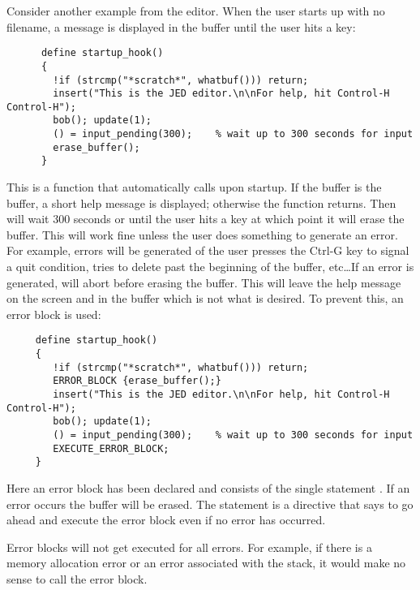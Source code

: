    Consider another example from the \jed{} editor.  When the user starts up
   \jed{} with no filename, a message is displayed in the 
   buffer until the user hits a key:
\begin{verbatim}
      define startup_hook()
      {
        !if (strcmp("*scratch*", whatbuf())) return;
        insert("This is the JED editor.\n\nFor help, hit Control-H Control-H");
        bob(); update(1);
        () = input_pending(300);    % wait up to 300 seconds for input
        erase_buffer();
      }
\end{verbatim}
   This is a function that \jed{} automatically calls upon startup.  If the
   buffer is the  buffer, a short help message is displayed;
   otherwise the function returns.  Then \jed{} will wait $300$ seconds or
   until the user hits a key at which point it will erase the buffer.  This
   will work fine unless the user does something to generate an error.  For
   example, errors will be generated of the user presses the {\sc Ctrl-G}
   key to signal a quit condition, tries to delete past the beginning of the
   buffer, etc\ldots  If an error is generated, \slang{} will abort before
   erasing the buffer. This will leave the help message on the screen and in
   the buffer which is not what is desired.  To prevent this, an error block
   is used:
\begin{verbatim}
     define startup_hook()
     {
        !if (strcmp("*scratch*", whatbuf())) return;
        ERROR_BLOCK {erase_buffer();}
        insert("This is the JED editor.\n\nFor help, hit Control-H Control-H");
        bob(); update(1);
        () = input_pending(300);    % wait up to 300 seconds for input
        EXECUTE_ERROR_BLOCK;
     }
\end{verbatim}
   Here an error block has been declared and consists of the single
   statement . If an error occurs the buffer will be
   erased. The statement  is a \slang{} directive
   that says to go ahead and execute the error block even if no error has
   occurred.

   Error blocks will not get executed for all errors.  For example, if there
   is a memory allocation error or an error associated with the stack, it
   would make no sense to call the error block.  

